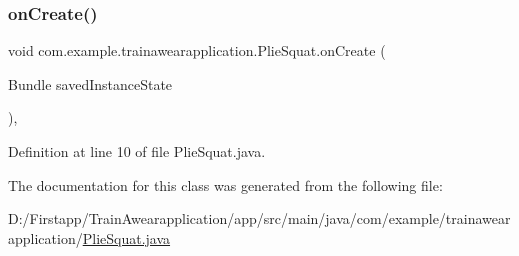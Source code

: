 \subsubsection{\texorpdfstring{onCreate()}{onCreate()}}
{\footnotesize\ttfamily void com.\+example.\+trainawearapplication.\+Plie\+Squat.\+on\+Create (\begin{DoxyParamCaption}\item[{Bundle}]{saved\+Instance\+State }\end{DoxyParamCaption})\hspace{0.3cm}{\ttfamily [inline]}, {\ttfamily [protected]}}



Definition at line 10 of file Plie\+Squat.\+java.


\begin{DoxyCode}{0}

\end{DoxyCode}


The documentation for this class was generated from the following file\+:\begin{DoxyCompactItemize}
\item 
D\+:/\+Firstapp/\+Train\+Awearapplication/app/src/main/java/com/example/trainawearapplication/\mbox{\hyperlink{_plie_squat_8java}{Plie\+Squat.\+java}}\end{DoxyCompactItemize}
